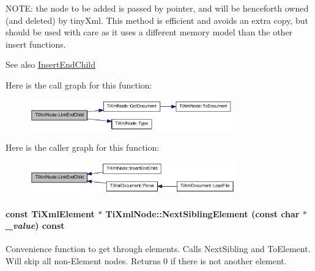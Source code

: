 NOTE: the node to be added is passed by pointer, and will be henceforth owned (and deleted) by tinyXml. This method is efficient and avoids an extra copy, but should be used with care as it uses a different memory model than the other insert functions.

\begin{DoxySeeAlso}{See also}
\hyperlink{class_ti_xml_node_af287a913ce46d8dbf7ef24fec69bbaf0}{InsertEndChild} 
\end{DoxySeeAlso}


Here is the call graph for this function:\nopagebreak
\begin{figure}[H]
\begin{center}
\leavevmode
\includegraphics[width=248pt]{class_ti_xml_node_a1a881212554b759865f6cac79a851d38_cgraph}
\end{center}
\end{figure}


Here is the caller graph for this function:\nopagebreak
\begin{figure}[H]
\begin{center}
\leavevmode
\includegraphics[width=251pt]{class_ti_xml_node_a1a881212554b759865f6cac79a851d38_icgraph}
\end{center}
\end{figure}
\hypertarget{class_ti_xml_node_a3d7897999f99cf4870dd59df6331d7ff}{
\paragraph[{NextSiblingElement}]{\setlength{\rightskip}{0pt plus 5cm}const {\bf TiXmlElement} $\ast$ TiXmlNode::NextSiblingElement (const char $\ast$ {\em \_\-value}) const}\hfill}
\label{class_ti_xml_node_a3d7897999f99cf4870dd59df6331d7ff}
Convenience function to get through elements. Calls NextSibling and ToElement. Will skip all non-\/Element nodes. Returns 0 if there is not another element. 

